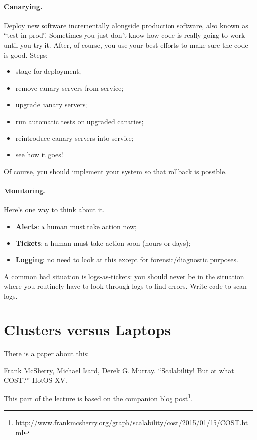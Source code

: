 \documentclass[11pt]{article}
\newenvironment{itemizep}{
 \begin{itemize}
  \setlength{\itemsep}{0pt}
  \setlength{\parsep}{3pt}
  \setlength{\topsep}{3pt}
  \setlength{\partopsep}{0pt}
  \setlength{\leftmargin}{1.5em}
  \setlength{\labelwidth}{1em}
  \setlength{\labelsep}{0.5em} }
 {\end{itemize}}
\begin{document}
\paragraph{Canarying.}
Deploy new software incrementally alongside production software, also known as ``test in prod''. Sometimes
you just don't know how code is really going to work until you try it. After, of course, you use your best
efforts to make sure the code is good. Steps:
\begin{itemizep}
\item stage for deployment;
\item remove canary servers from service;
\item upgrade canary servers;
\item run automatic tests on upgraded canaries;
\item reintroduce canary servers into service;
\item see how it goes!
\end{itemizep}
Of course, you should implement your system so that rollback is possible.

\paragraph{Monitoring.}
Here's one way to think about it. 
\begin{itemizep}
\item {\bf Alerts}: a human must take action now;
\item {\bf Tickets}: a human must take action soon (hours or days);
\item {\bf Logging}: no need to look at this except for forensic/diagnostic purposes.
\end{itemizep}
A common bad situation is logs-as-tickets: you should never be in the
situation where you routinely have to look through logs to find
errors. Write code to scan logs.

\section*{Clusters versus Laptops}
There is a paper about this:

\noindent
Frank McSherry, Michael Isard, Derek G. Murray. ``Scalability! But at what COST?'' HotOS XV.

This part of the lecture is based on the companion blog post\footnote{\url{http://www.frankmcsherry.org/graph/scalability/cost/2015/01/15/COST.html}}.
\end{document}
